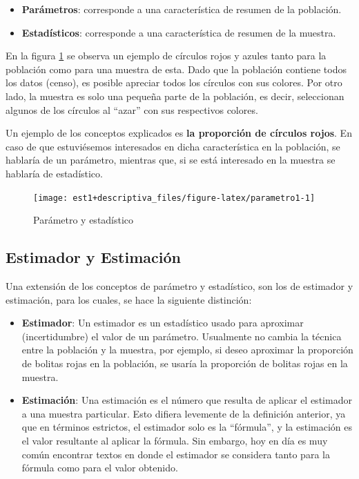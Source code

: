 \documentclass[
  11pt,
]{book}
\providecommand{\tightlist}{%
  \setlength{\itemsep}{0pt}\setlength{\parskip}{0pt}}
\theoremstyle{definition}
\theoremstyle{definition}
\theoremstyle{definition}
\theoremstyle{definition}
\theoremstyle{remark}
\begin{document}
\begin{itemize}
\tightlist
\item
  \textbf{Parámetros}: corresponde a una característica de resumen de la población.
\item
  \textbf{Estadísticos}: corresponde a una característica de resumen de la muestra.
\end{itemize}

En la figura \ref{fig:parametro1} se observa un ejemplo de círculos rojos y azules tanto para la población como para una muestra de esta. Dado que la población contiene todos los datos (censo), es posible apreciar todos los círculos con sus colores. Por otro lado, la muestra es solo una pequeña parte de la población, es decir, seleccionan algunos de los círculos al ``azar'' con sus respectivos colores.

Un ejemplo de los conceptos explicados es \textbf{la proporción de círculos rojos}. En caso de que estuviésemos interesados en dicha característica en la población, se hablaría de un parámetro, mientras que, si se está interesado en la muestra se hablaría de estadístico.

\begin{figure}

{\centering \texttt{[image: est1+descriptiva\_files/figure-latex/parametro1-1]} 

}

\caption{Parámetro y estadístico}\label{fig:parametro1}
\end{figure}

\subsection{Estimador y Estimación}\label{estimador-y-estimaciuxf3n}

Una extensión de los conceptos de parámetro y estadístico, son los de estimador y estimación, para los cuales, se hace la siguiente distinción:

\begin{itemize}
\item
  \textbf{Estimador}: Un estimador es un estadístico usado para aproximar (incertidumbre) el valor de un parámetro. Usualmente no cambia la técnica entre la población y la muestra, por ejemplo, si deseo aproximar la proporción de bolitas rojas en la población, se usaría la proporción de bolitas rojas en la muestra.
\item
  \textbf{Estimación}: Una estimación es el número que resulta de aplicar el estimador a una muestra particular. Esto difiera levemente de la definición anterior, ya que en términos estrictos, el estimador solo es la ``fórmula'', y la estimación es el valor resultante al aplicar la fórmula. Sin embargo, hoy en día es muy común encontrar textos en donde el estimador se considera tanto para la fórmula como para el valor obtenido.
\end{itemize}
\end{document}
